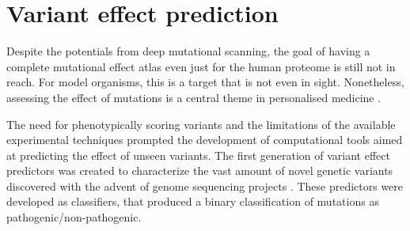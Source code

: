 \section{Variant effect prediction}
Despite the potentials from deep mutational scanning, the goal of having a complete mutational effect atlas even just for the human proteome is still not in reach.
For model organisms, this is a target that is not even in sight.
Nonetheless, assessing the effect of mutations is a central theme in personalised medicine \parencite{Goetz2018}.

The need for phenotypically scoring variants and the limitations of the available experimental techniques prompted the development of computational tools aimed at predicting the effect of unseen variants.
The first generation of variant effect predictors was created to characterize the vast amount of novel genetic variants discovered with the advent of genome sequencing projects \parencite{Collins1998,Ng2001,Ramensky2002}.
These predictors were developed as classifiers, that produced a binary classification of mutations as pathogenic/non-pathogenic.

